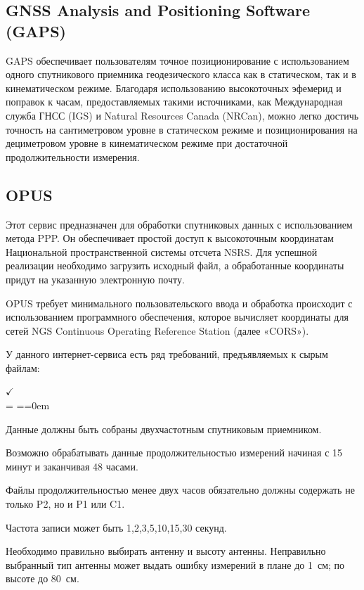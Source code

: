 \subsection{GNSS Analysis and Positioning Software (GAPS)}\label{subsec:ch2/sec1/sub5}

GAPS обеспечивает пользователям точное позиционирование с использованием одного спутникового приемника геодезического класса как в статическом, так и в кинематическом режиме. Благодаря использованию высокоточных эфемерид и поправок к часам, предоставляемых такими источниками, как Международная служба ГНСС (IGS) и Natural Resources Canada (NRCan), можно легко достичь точность на сантиметровом уровне в статическом режиме и позиционирования на дециметровом уровне в кинематическом режиме при достаточной продолжительности измерения.

\subsection{OPUS}\label{subsec:ch2/sec1/sub6}

Этот сервис предназначен для обработки спутниковых данных с использованием метода PPP. Он обеспечивает простой доступ к высокоточным координатам Национальной пространственной системы отсчета NSRS.  Для успешной реализации необходимо загрузить исходный файл, а обработанные координаты придут на указанную электронную почту.

OPUS требует минимального пользовательского ввода и обработка происходит с использованием программного обеспечения, которое вычисляет координаты для сетей NGS Continuous Operating Reference Station (далее «CORS»). 

У данного интернет-сервиса есть ряд требований, предъявляемых к сырым файлам:

\begin{list}{$ \checkmark $\\[6pt]} {\parsep = \parskip \itemsep=\parsep \topsep=0em}
	\item Данные должны быть собраны двухчастотным спутниковым приемником. 
	\item Возможно обрабатывать данные продолжительностью измерений начиная с 15 минут и заканчивая 48 часами.
	\item Файлы продолжительностью менее двух часов обязательно должны содержать не только P2, но и P1 или C1.
	\item Частота записи может быть 1,2,3,5,10,15,30 секунд.
	\item Необходимо правильно выбирать антенну и высоту антенны. Неправильно выбранный тип антенны может выдать ошибку измерений в плане до 1~см; по высоте до 80~см.
\end{list}

